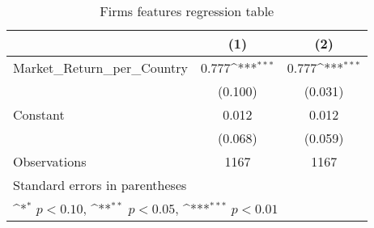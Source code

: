 \begin{table}[htbp]\centering
\def\sym#1{\ifmmode^{#1}\else\(^{#1}\)\fi}
\caption{Firms features regression table \label{reg1}}
\begin{tabular}{l*{2}{c}}
\toprule
                    &\multicolumn{1}{c}{(1)}         &\multicolumn{1}{c}{(2)}         \\
\midrule
Market\_Return\_per\_Country&       0.777\sym{***}&       0.777\sym{***}\\
                    &     (0.100)         &     (0.031)         \\
\addlinespace
Constant            &       0.012         &       0.012         \\
                    &     (0.068)         &     (0.059)         \\
\midrule
Observations        &        1167         &        1167         \\
\bottomrule
\multicolumn{3}{l}{\footnotesize Standard errors in parentheses}\\
\multicolumn{3}{l}{\footnotesize \sym{*} \(p<0.10\), \sym{**} \(p<0.05\), \sym{***} \(p<0.01\)}\\
\end{tabular}
\end{table}

